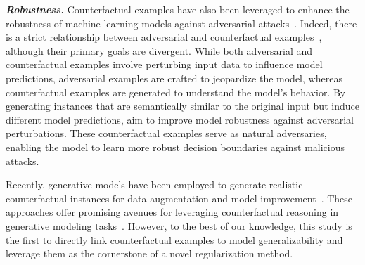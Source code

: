 \smallskip
\noindent \textit{\textbf{Robustness.}} Counterfactual examples have also been leveraged to enhance the robustness of machine learning models against adversarial attacks~\citep{brown2018arxiv}. Indeed, there is a strict relationship between adversarial and counterfactual examples~\citep{freiesleben2022mm}, although their primary goals are divergent. While both adversarial and counterfactual examples involve perturbing input data to influence model predictions, adversarial examples are crafted to jeopardize the model, whereas counterfactual examples are generated to understand the model's behavior.
By generating instances that are semantically similar to the original input but induce different model predictions, \citet{he2019acsac} aim to improve model robustness against adversarial perturbations. These counterfactual examples serve as natural adversaries, enabling the model to learn more robust decision boundaries against malicious attacks.


Recently, generative models have been employed to generate realistic counterfactual instances for data augmentation and model improvement~\citep{ganin2016jmlr,hjelm2019iclr}. 
These approaches offer promising avenues for leveraging counterfactual reasoning in generative modeling tasks~\citep{lopez2020msb}.
However, to the best of our knowledge, this study is the first to directly link counterfactual examples to model generalizability and leverage them as the cornerstone of a novel regularization method.
